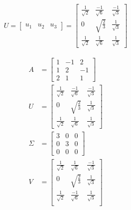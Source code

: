 \documentclass[a4paper, spanish]{article}
\begin{document}
  \begin{align}
    U =
    \begin{bmatrix}
      u_1 & u_2 & u_3
    \end{bmatrix} =
    \begin{bmatrix}
      \frac{1}{\sqrt{2}} & \frac{-1}{\sqrt{6}} & \frac{-1}{\sqrt{3}} \\
      0 & \sqrt{\frac{2}{3}} & \frac{1}{\sqrt{3}} \\
      \frac{1}{\sqrt{2}} & \frac{1}{\sqrt{6}} & \frac{1}{\sqrt{3}}
    \end{bmatrix}
  \end{align}


  \begin{align}
    A &=
    \begin{bmatrix}
      1 & -1 & 2\\
      1 & 2 & -1\\
      2 & 1 & 1
    \end{bmatrix} \\
    U &=
    \begin{bmatrix}
      \frac{1}{\sqrt{2}} & \frac{-1}{\sqrt{6}} & \frac{-1}{\sqrt{3}} \\
      0 & \sqrt{\frac{2}{3}} & \frac{1}{\sqrt{3}} \\
      \frac{1}{\sqrt{2}} & \frac{1}{\sqrt{6}} & \frac{1}{\sqrt{3}}
    \end{bmatrix} \\
    \Sigma &=
    \begin{bmatrix}
      3 & 0 & 0\\
      0 & 3 & 0\\
      0 & 0 & 0
    \end{bmatrix} \\
    V &=
    \begin{bmatrix}
      \frac{1}{\sqrt{2}} & \frac{1}{\sqrt{6}} & \frac{-1}{\sqrt{3}} \\
      0 & \sqrt{\frac{2}{3}} &\frac{1}{\sqrt{3}} \\
      \frac{1}{\sqrt{2}} & \frac{-1}{\sqrt{6}} & \frac{1}{\sqrt{3}} \\
    \end{bmatrix}
  \end{align}
\end{document}
